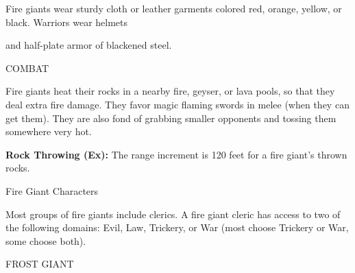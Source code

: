 \documentclass{article}
\begin{document}
Fire giants wear sturdy cloth or leather garments colored red, orange, yellow, 
or black. Warriors wear helmets

and half-plate armor of blackened steel.

COMBAT

Fire giants heat their rocks in a nearby fire, geyser, or lava pools, so that they 
deal extra fire damage. They favor magic flaming swords in melee (when they can 
get them). They are also fond of grabbing smaller opponents and tossing them somewhere 
very hot.

\textbf{Rock Throwing (Ex):} The range increment is 120 feet for a fire giant's 
thrown rocks.

Fire Giant Characters

Most groups of fire giants include clerics. A fire giant cleric has access to two 
of the following domains: Evil, Law, Trickery, or War (most choose Trickery or 
War, some choose both).

\vspace{12pt}
FROST GIANT
\end{document}
